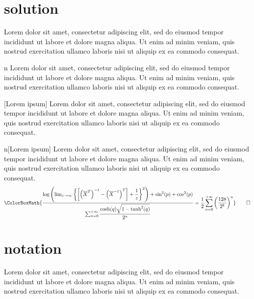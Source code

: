 \newpage

\section{solution}

\begin{solution}{}
	Lorem dolor sit amet, consectetur adipiscing elit, sed do eiusmod tempor incididunt ut labore et dolore magna aliqua. Ut enim ad minim veniam, quis nostrud exercitation ullamco laboris nisi ut aliquip ex ea commodo consequat.
\end{solution}

\begin{solution}{n}
	Lorem dolor sit amet, consectetur adipiscing elit, sed do eiusmod tempor incididunt ut labore et dolore magna aliqua. Ut enim ad minim veniam, quis nostrud exercitation ullamco laboris nisi ut aliquip ex ea commodo consequat.
\end{solution}

\begin{solution}{}[Lorem ipsum]
	Lorem dolor sit amet, consectetur adipiscing elit, sed do eiusmod tempor incididunt ut labore et dolore magna aliqua. Ut enim ad minim veniam, quis nostrud exercitation ullamco laboris nisi ut aliquip ex ea commodo consequat.
\end{solution}

\begin{solution}{n}[Lorem ipsum]
	Lorem dolor sit amet, consectetur adipiscing elit, sed do eiusmod tempor incididunt ut labore et dolore magna aliqua. Ut enim ad minim veniam, quis nostrud exercitation ullamco laboris nisi ut aliquip ex ea commodo consequat.
	\begin{equation*}
		\ColorBoxMath{\dfrac{\log\left(\lim_{z\to\infty}\left\{\left[\left(\overline{X}^{T}\right)^{-1}-\left(\overline{X}^{-1}\right)^T\right]+\dfrac{1}{z}\right\}^2\right)+\sin^2(p)+\cos^2(p)}{\sum_{n=0}^{+\infty}\dfrac{\cosh(q)\sqrt{1-\tanh^2(q)}}{2^n}}=\dfrac{1}{2}\sum_{n=0}^{+\infty}\left(\dfrac{128}{2^8}\right)^n}\qedhere
	\end{equation*}
\end{solution}

\newpage

\section{notation}

\begin{notation}{}
	Lorem dolor sit amet, consectetur adipiscing elit, sed do eiusmod tempor incididunt ut labore et dolore magna aliqua. Ut enim ad minim veniam, quis nostrud exercitation ullamco laboris nisi ut aliquip ex ea commodo consequat.
\end{notation}


